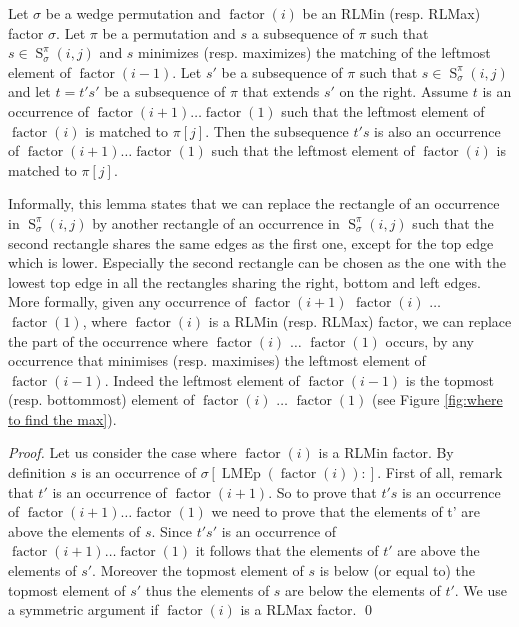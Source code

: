 \documentclass[a4paper]{llncs}
\newcommand{\ptext}{\pi}
\newcommand{\ppattern}{\sigma}
\DeclareMathOperator{\LMEi}{LMEp}
\DeclareMathOperator{\factor}{factor}
\DeclareMathOperator{\SETa}{S}
\newcommand{\SET}[4]{\SETa_{{#1}}^{{#2}}({#3},{#4})}
\begin{document}
\begin{lemma}
\label{lemma:ts}
Let $\ppattern$ be a wedge permutation and
$\factor(i)$ be an RLMin (resp. RLMax) factor $\sigma$.
Let $\pi$ be a permutation and $s$ a subsequence of $\pi$ such that
$s \in \SET{\ppattern}{\ptext}{i}{j}$ and
$s$ minimizes (resp. maximizes) the matching of the leftmost element of $\factor(i-1)$.
Let $s'$ be a subsequence of $\pi$ such that
$s \in \SET{\ppattern}{\ptext}{i}{j}$
and let $t=t's'$ be a subsequence of $\pi$ that extends $s'$ on the right.
Assume $t$ is an occurrence of $\factor(i+1)\ldots \factor(1)$ such that the leftmost element of $\factor(i)$ is matched to $\ptext[j]$. Then the subsequence $t's$ is also an occurrence of $\factor(i+1)\ldots \factor(1)$ such that the leftmost element of $\factor(i)$ is matched to $\ptext[j]$.
\end{lemma}

Informally, this lemma states that we can replace
the rectangle of an occurrence in $\SET{\ppattern}{\ptext}{i}{j}$
by another rectangle of an occurrence in $\SET{\ppattern}{\ptext}{i}{j}$
such that the second rectangle shares the same edges as the first one,
except for the top edge which is lower.
Especially the second rectangle can be chosen as the one with
the lowest top edge in all the rectangles sharing the right, bottom
and left edges.
More formally, given any occurrence of $\factor(i+1)$ $\factor(i)$ $\ldots$ $\factor(1)$,
where $\factor(i)$ is a RLMin (resp. RLMax) factor,
we can replace the part of the occurrence where $\factor(i)$ $\ldots$ $\factor(1)$ occurs, by any occurrence
that minimises (resp. maximises) the leftmost element of $\factor(i-1)$. Indeed the leftmost element of $\factor(i-1)$ is the topmost (resp. bottommost) element of  $\factor(i)$ $\ldots$ $\factor(1)$ (see Figure \ref{fig:where to find the max}).

\begin{proof} %
Let us consider the case where $\factor(i)$ is a RLMin factor.
By definition $s$ is an occurrence of $\ppattern[\LMEi(\factor(i)):]$.
First of all, remark that $t'$ is an occurrence of $\factor(i+1)$.
So to prove that $t's$ is an occurrence of $\factor(i+1)\ldots \factor(1)$ we need to prove that the elements of t' are above the elements of $s$.
Since $t's'$ is an occurrence of $\factor(i+1)\ldots \factor(1)$ it follows that the elements of $t'$ are above the elements of $s'$. Moreover the topmost element of $s$ is below (or equal to) the topmost element of $s'$ thus the elements of $s$ are below the elements of $t'$. We use a symmetric argument if $\factor(i)$ is a RLMax factor.
\qed
\end{proof}
\end{document}
